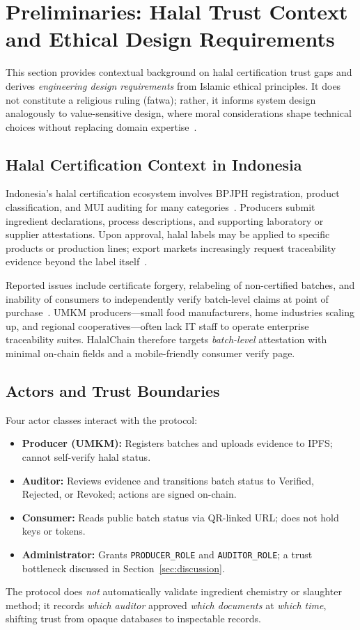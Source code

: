 \section{Preliminaries: Halal Trust Context and Ethical Design Requirements}
\label{sec:prelim}

This section provides contextual background on halal certification trust gaps and derives \emph{engineering design requirements} from Islamic ethical principles.
It does not constitute a religious ruling (fatwa); rather, it informs system design analogously to value-sensitive design, where moral considerations shape technical choices without replacing domain expertise~\cite{friedman2017value}.

\subsection{Halal Certification Context in Indonesia}
Indonesia's halal certification ecosystem involves BPJPH registration, product classification, and MUI auditing for many categories~\cite{sidarto2021halal,bpjph2022regulation}.
Producers submit ingredient declarations, process descriptions, and supporting laboratory or supplier attestations.
Upon approval, halal labels may be applied to specific products or production lines; export markets increasingly request traceability evidence beyond the label itself~\cite{marianingsih2024halal}.

Reported issues include certificate forgery, relabeling of non-certified batches, and inability of consumers to independently verify batch-level claims at point of purchase~\cite{rashid2018halal,kshetri2018blockchain}.
UMKM producers---small food manufacturers, home industries scaling up, and regional cooperatives---often lack IT staff to operate enterprise traceability suites.
HalalChain therefore targets \emph{batch-level} attestation with minimal on-chain fields and a mobile-friendly consumer verify page.

\subsection{Actors and Trust Boundaries}
Four actor classes interact with the protocol:
\begin{itemize}
  \item \textbf{Producer (UMKM):} Registers batches and uploads evidence to IPFS; cannot self-verify halal status.
  \item \textbf{Auditor:} Reviews evidence and transitions batch status to Verified, Rejected, or Revoked; actions are signed on-chain.
  \item \textbf{Consumer:} Reads public batch status via QR-linked URL; does not hold keys or tokens.
  \item \textbf{Administrator:} Grants \texttt{PRODUCER\_ROLE} and \texttt{AUDITOR\_ROLE}; a trust bottleneck discussed in Section~\ref{sec:discussion}.
\end{itemize}
The protocol does \emph{not} automatically validate ingredient chemistry or slaughter method; it records \emph{which auditor} approved \emph{which documents} at \emph{which time}, shifting trust from opaque databases to inspectable records.

